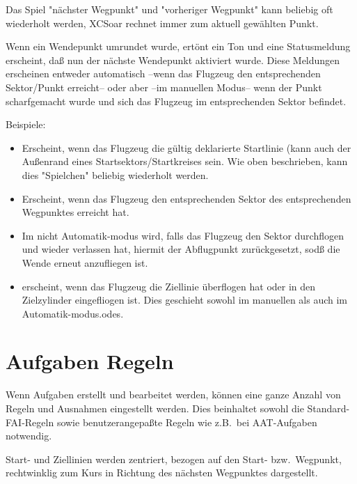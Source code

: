 Das Spiel "nächster Wegpunkt" und "vorheriger Wegpunkt" kann  beliebig oft wiederholt werden, \textsf{XCSoar} rechnet immer zum aktuell gewählten Punkt.

Wenn ein Wendepunkt umrundet  wurde, ertönt ein Ton und eine Statusmeldung erscheint, daß nun  der nächste Wendepunkt aktiviert wurde. Diese Meldungen erscheinen entweder automatisch --wenn das Flugzeug den entsprechenden Sektor/Punkt erreicht--  oder aber --im manuellen Modus-- wenn der Punkt scharfgemacht wurde und sich das Flugzeug im entsprechenden Sektor befindet.

Beispiele:
\begin{itemize}
\item[\p{Aufgabenstart}]  Erscheint, wenn das Flugzeug die gültig deklarierte Startlinie (kann auch der Außenrand eines Startsektors/Startkreises sein. Wie oben beschrieben, kann dies "Spielchen" beliebig wiederholt werden.

\item[\p{Nächster Wendepunkt}]  Erscheint, wenn das Flugzeug den entsprechenden Sektor des entsprechenden Wegpunktes erreicht hat.

\item[\p{Abflugpunkt}] Im nicht Automatik-modus  wird, falls das Flugzeug den Sektor durchflogen und wieder verlassen hat, hiermit der Abflugpunkt zurückgesetzt, sodß die Wende erneut anzufliegen ist.

\item[\p{Aufgabenende}]  erscheint, wenn das Flugzeug die Ziellinie überflogen hat oder in den Zielzylinder  eingefliogen ist. Dies geschieht sowohl im manuellen als auch im Automatik-modus.odes.
\end{itemize}

\section{Aufgaben Regeln}\label{sec:task-rules}
Wenn Aufgaben erstellt und bearbeitet werden, können eine ganze Anzahl  von Regeln und Ausnahmen  eingestellt werden. Dies beinhaltet sowohl die Standard-FAI-Regeln sowie benutzerangepaßte Regeln wie z.B.\ bei AAT-Aufgaben notwendig.

Start- und Ziellinien werden zentriert, bezogen auf den Start- bzw.\  Wegpunkt, rechtwinklig zum Kurs in Richtung des nächsten Wegpunktes dargestellt.\\

